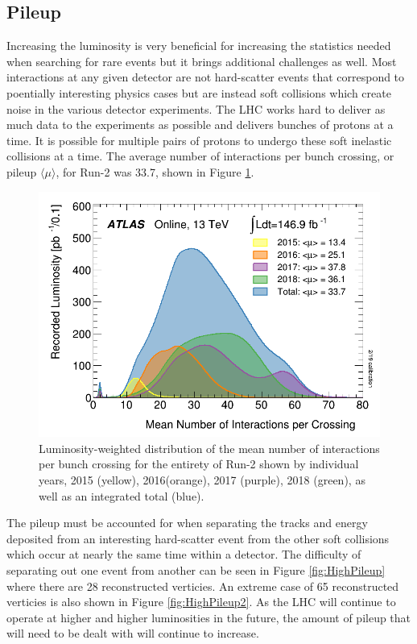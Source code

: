 \subsection{Pileup}

Increasing the luminosity is very beneficial for increasing the statistics needed when searching for rare events but it brings additional challenges as well.  Most interactions at any given detector are not hard-scatter events that correspond to poentially interesting physics cases but are instead soft collisions which create noise in the various detector experiments.  The LHC works hard to deliver as much data to the experiments as possible and delivers bunches of protons at a time.  It is possible for multiple pairs of protons to undergo these soft inelastic collisions at a time.  The average number of interactions per bunch crossing, or pileup $\langle{\mu}\rangle$, for Run-2 was 33.7, shown in Figure \ref{fig:ATLASmeanIntperCrossing}. 
\begin{figure}[ht!]
	\centering
	\includegraphics[width=.7\columnwidth]{../ThesisImages/LHCImages/meanIntperCrossing.png}
	\caption[Luminosity-weighted distribution of the mean number of interactions per bunch crossing for the entirety of Run-2 shown by individual years, 2015 (yellow), 2016(orange), 2017 (purple), 2018 (green), as well as an integrated total (blue).]{Luminosity-weighted distribution of the mean number of interactions per bunch crossing for the entirety of Run-2 shown by individual years, 2015 (yellow), 2016(orange), 2017 (purple), 2018 (green), as well as an integrated total (blue)\cite{ATLASLumi}.
	}
	\label{fig:ATLASmeanIntperCrossing}
\end{figure}
 The pileup must be accounted for when separating the tracks and energy deposited from an interesting hard-scatter event from the other soft collisions which occur at nearly the same time within a detector.  The difficulty of separating out one event from another can be seen in Figure \ref{fig:HighPileup} where there are 28 reconstructed verticies.  An extreme case of 65 reconstructed verticies is also shown in Figure \ref{fig:HighPileup2}.  As the LHC will continue to operate at higher and higher luminosities in the future, the amount of pileup that will need to be dealt with will continue to increase.  
